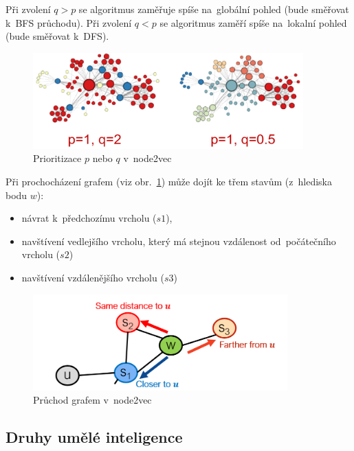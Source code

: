 Při zvolení $q>p$ se algoritmus zaměřuje spíše na~globální pohled (bude směřovat k~BFS průchodu). Při zvolení $q<p$ se algoritmus zaměří spíše na~lokalní pohled (bude směřovat k~DFS).

\begin{figure}[ht]
    \centering
    \includegraphics[height=10em]{images/11_node2vec-pq}
    \caption{Prioritizace $p$ nebo $q$ v~node2vec}
\end{figure}

Při prochocházení grafem (viz obr.~\ref{pruchod-node2vec}) může dojít ke třem stavům (z~hlediska bodu $w$):
\begin{itemize}
    \item návrat k~předchozímu vrcholu ($s1$),
    \item navštívení vedlejšího vrcholu, který má stejnou vzdálenost od~počátečního vrcholu ($s2$)
    \item navštívení vzdálenějšího vrcholu ($s3$)
\end{itemize}

\begin{figure}
    \centering
    \includegraphics[height=10em]{images/node2vec.png}
    \caption{Průchod grafem v~node2vec}
    \label{pruchod-node2vec}
\end{figure}

\subsection{Druhy umělé inteligence}

